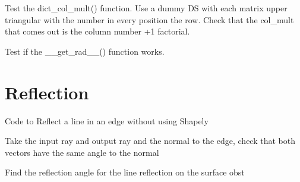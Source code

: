 \documentclass[letterpaper,10pt,english]{sphinxmanual}
\begin{document}

\begin{fulllineitems}
\label{index:DictionarySparseMatrix.test_20}
Test the dict\_col\_mult() function.
Use a dummy DS with each matrix upper triangular with the number in   every position the row.
Check that the col\_mult that comes out is the column number +1   factorial.

\end{fulllineitems}


\begin{fulllineitems}
\label{index:DictionarySparseMatrix.test_21}
Test if the \_\_get\_rad\_\_() function works.

\end{fulllineitems}



\chapter{Reflection}
\label{index:module-reflection}\label{index:reflection}
Code to Reflect a line in an edge without using Shapely

\begin{fulllineitems}
\label{index:reflection.errorcheck}
Take the input ray and output ray and the normal to the edge,
check that both vectors have the same angle to the normal

\end{fulllineitems}


\begin{fulllineitems}
\label{index:reflection.refangle}
Find the reflection angle for the line reflection on the surface obst

\end{fulllineitems}

\end{document}
